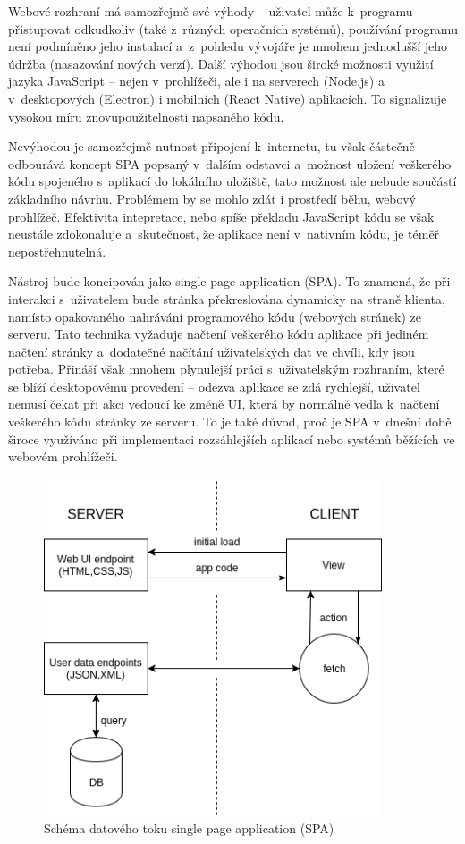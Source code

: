 Webové rozhraní má samozřejmě své výhody -- uživatel může k~programu přistupovat odkudkoliv (také z~různých operačních systémů), používání programu není podmíněno jeho instalací a~z~pohledu vývojáře je mnohem jednodušší jeho údržba (nasazování nových verzí). Další výhodou jsou široké možnosti využití jazyka JavaScript -- nejen v~prohlížeči, ale i na serverech (Node.js) a v~desktopových (Electron) i mobilních (React Native) aplikacích. To signalizuje vysokou míru znovupoužitelnosti napsaného kódu. 

Nevýhodou je samozřejmě nutnost připojení k~internetu, tu však částečně odbourává koncept SPA popsaný v~dalším odstavci a~možnost uložení veškerého kódu spojeného s~aplikací do lokálního uložiště, tato možnost ale nebude součástí základního návrhu. Problémem by se mohlo zdát i prostředí běhu, webový prohlížeč. Efektivita intepretace, nebo spíše překladu JavaScript kódu se však neustále zdokonaluje a~skutečnost, že aplikace není v~nativním kódu, je téměř nepostřehnutelná. 

Nástroj bude koncipován jako single page application (SPA). To znamená, že při interakci s~uživatelem bude stránka překreslována dynamicky na straně klienta, namísto opakovaného nahrávání programového kódu (webových stránek) ze serveru. Tato technika vyžaduje načtení veškerého kódu aplikace při jediném načtení stránky a~dodatečné načítání uživatelských dat ve chvíli, kdy jsou potřeba. Přináší však mnohem plynulejší práci s~uživatelským rozhraním, které se blíží desktopovému provedení -- odezva aplikace se zdá rychlejší, uživatel nemusí čekat při akci vedoucí ke změně UI, která by normálně vedla k~načtení veškerého kódu stránky ze serveru. To je také důvod, proč je SPA v~dnešní době široce využíváno při implementaci rozsáhlejších aplikací nebo systémů běžících ve webovém prohlížeči. 


\begin{figure}
  \centering
  \includegraphics[width=10cm]{img/spa.png}
  \caption{Schéma datového toku single page application (SPA)}
  \label{spa}
\end{figure}

